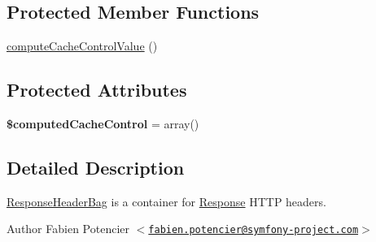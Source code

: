 \subsection*{\-Protected \-Member \-Functions}
\begin{DoxyCompactItemize}
\item 
\hyperlink{class_symfony_1_1_component_1_1_http_foundation_1_1_response_header_bag_ace5eb774921c2916c88d5fbf59189c5c}{compute\-Cache\-Control\-Value} ()
\end{DoxyCompactItemize}
\subsection*{\-Protected \-Attributes}
\begin{DoxyCompactItemize}
\item 
\hypertarget{class_symfony_1_1_component_1_1_http_foundation_1_1_response_header_bag_aa21a0efb254966a8e3b55ec1e9464f0e}{
{\bfseries \$computed\-Cache\-Control} = array()}
\label{class_symfony_1_1_component_1_1_http_foundation_1_1_response_header_bag_aa21a0efb254966a8e3b55ec1e9464f0e}

\end{DoxyCompactItemize}


\subsection{\-Detailed \-Description}
\hyperlink{class_symfony_1_1_component_1_1_http_foundation_1_1_response_header_bag}{\-Response\-Header\-Bag} is a container for \hyperlink{class_symfony_1_1_component_1_1_http_foundation_1_1_response}{\-Response} \-H\-T\-T\-P headers.

\begin{DoxyAuthor}{\-Author}
\-Fabien \-Potencier $<$\href{mailto:fabien.potencier@symfony-project.com}{\tt fabien.\-potencier@symfony-\/project.\-com}$>$ 
\end{DoxyAuthor}



